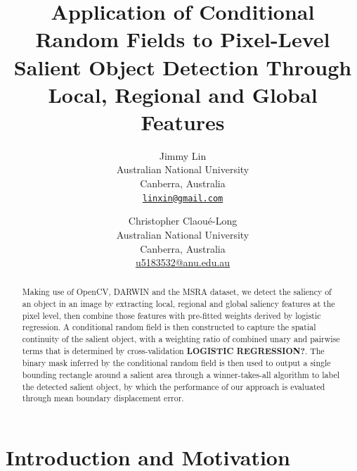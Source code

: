 \documentclass[10pt,twocolumn,letterpaper]{article}
\newcommand{\BOLD}{\textbf}
\begin{document}
\title{Application of Conditional Random Fields to Pixel-Level Salient Object Detection Through Local, Regional and Global Features}

\author{Jimmy Lin\\
Australian National University\\
Canberra, Australia\\
{\tt\small \url{linxin@gmail.com}}
\and
Christopher Claou\'e-Long\\
Australian National University\\
Canberra, Australia\\
{\small\url{u5183532@anu.edu.au}}
}

\maketitle

\begin{abstract}
Making use of OpenCV, DARWIN and the MSRA dataset, we detect the saliency of an object in an image by extracting local, regional and global saliency features at the pixel level, then combine those features with pre-fitted weights derived by logistic regression. A conditional random field is then constructed to capture the spatial continuity of the salient object, with a weighting ratio of combined unary and pairwise terms that is determined by cross-validation \BOLD{LOGISTIC REGRESSION?}. The binary mask inferred by the conditional random field is then used to output a single bounding rectangle around a salient area through a winner-takes-all algorithm to label the detected salient object, by which the performance of our approach is evaluated through mean boundary displacement error. 
\end{abstract}

\section{Introduction and Motivation}
\end{document}
